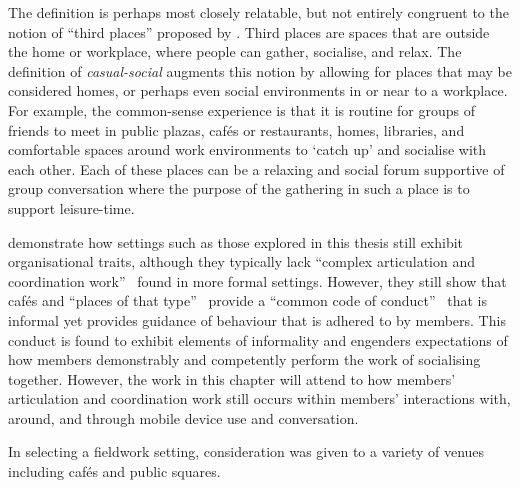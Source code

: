 The definition is perhaps most closely relatable, but not entirely congruent to the notion of ``third places'' proposed by \citet{Oldenburg1989}.
Third places are spaces that are outside the home or workplace, where people can gather, socialise, and relax.
The definition of \textit{casual-social} augments this notion by allowing for places that may be considered homes, or perhaps even social environments in or near to a workplace.
For example, the common-sense experience is that it is routine for groups of friends to meet in public plazas, caf\'es or restaurants, homes, libraries, and comfortable spaces around work environments to `catch up' and socialise with each other.
Each of these places can be a relaxing and social forum supportive of group conversation where the purpose of the gathering in such a place is to support leisure-time.

\citet{Laurier2001} demonstrate how settings such as those explored in this thesis still exhibit organisational traits, although they typically lack ``complex articulation and coordination work''~\citep[p. 222]{Laurier2001} found in more formal settings.
However, they still show that caf\'es and ``places of that type''~\citep[p. 199]{Laurier2001} provide a ``common code of conduct''~\citep[p. 210]{Laurier2001} that is informal yet provides guidance of behaviour that is adhered to by members.
This conduct is found to exhibit elements of informality and engenders expectations of how members demonstrably and competently perform the work of socialising together.
However, the work in this chapter will attend to how members' articulation and coordination work still occurs within members' interactions with, around, and through mobile device use and conversation.

In selecting a fieldwork setting, consideration was given to a variety of venues including caf\'es and public squares. 

